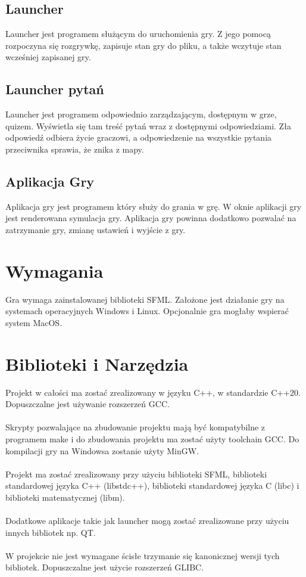\documentclass[12pt, titlepage]{article}
\begin{document}
\subsection{Launcher}
Launcher jest programem służącym do uruchomienia gry.
Z jego pomocą rozpoczyna się rozgrywkę, zapisuje stan gry do pliku, a także wczytuje stan 
wcześniej zapisanej gry.

\subsection{Launcher pytań}
Launcher jest programem odpowiednio zarządzającym, dostępnym w grze, quizem.
Wyświetla się tam treść pytań wraz z dostępnymi odpowiedziami. Zła odpowiedź odbiera
życie graczowi, a odpowiedzenie na wszystkie pytania przeciwnika sprawia, że znika z mapy.

\subsection{Aplikacja Gry}
Aplikacja gry jest programem który służy
do grania w grę. W oknie aplikacji gry jest
renderowana symulacja gry. Aplikacja gry
powinna dodatkowo pozwalać na zatrzymanie
gry, zmianę ustawień i wyjście z gry.

\section{Wymagania}
Gra wymaga zainstalowanej biblioteki
SFML. Założone jest działanie gry
na systemach operacyjnych Windows i
Linux. Opcjonalnie gra mogłaby wspierać
system MacOS.

\section{Biblioteki i Narzędzia}
Projekt w całości ma zostać zrealizowany
w języku C++, w standardzie C++20.
Dopuszczalne jest używanie rozszerzeń
GCC.
\\~\\
Skrypty pozwalające na zbudowanie
projektu mają być kompatybilne z
programem make i do zbudowania
projektu ma zostać użyty toolchain
GCC. Do kompilacji gry na Windowsa
zostanie użyty MinGW.
\\~\\
Projekt ma zostać zrealizowany przy
użyciu biblioteki SFML, biblioteki
standardowej języka C++ (libstdc++),
biblioteki standardowej języka C (libc)
i biblioteki matematycznej (libm).
\\~\\
Dodatkowe aplikacje takie jak
launcher mogą zostać zrealizowane
przy użyciu innych bibliotek np.
QT.
\\~\\
W projekcie nie jest wymagane ścisłe
trzymanie się kanonicznej wersji tych
bibliotek. Dopuszczalne jest użycie
rozszerzeń GLIBC.
\end{document}
